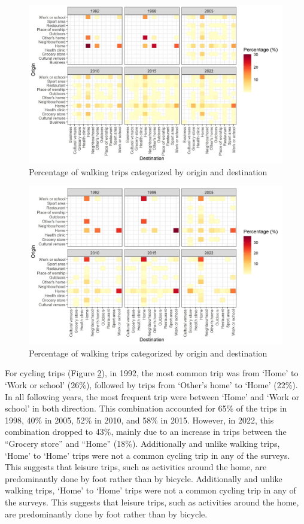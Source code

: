 \documentclass[preprint, 3p,
authoryear]{elsarticle} %
\begin{document}
\begin{figure}
\includegraphics[width=1\linewidth]{figures/walking_hm_fig} \caption{Percentage of walking trips categorized by origin and destination}\label{fig:walking-heatmap}
\end{figure}

\begin{figure}
\includegraphics[width=1\linewidth]{figures/cycling_hm_fig} \caption{Percentage of walking trips categorized by origin and destination}\label{fig:cycling-heatmap}
\end{figure}

For cycling trips (Figure \ref{fig:cycling-heatmap}), in 1992, the most
common trip was from `Home' to `Work or school' (26\%), followed by
trips from `Other's home' to `Home' (22\%). In all following years, the
most frequent trip were between `Home' and `Work or school' in both
direction. This combination accounted for 65\% of the trips in 1998,
40\% in 2005, 52\% in 2010, and 58\% in 2015. However, in 2022, this
combination dropped to 43\%, mainly due to an increase in trips between
the ``Grocery store'' and ``Home'' (18\%). Additionally and unlike
walking trips, `Home' to `Home' trips were not a common cycling trip in
any of the surveys. This suggests that leisure trips, such as activities
around the home, are predominantly done by foot rather than by bicycle.
Additionally and unlike walking trips, `Home' to `Home' trips were not a
common cycling trip in any of the surveys. This suggests that leisure
trips, such as activities around the home, are predominantly done by
foot rather than by bicycle.
\end{document}
